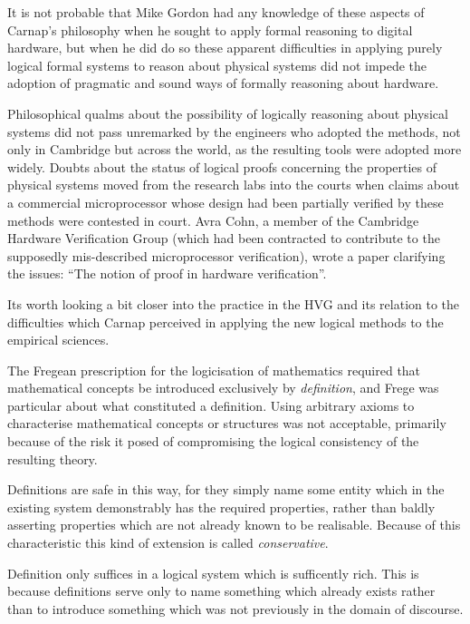 \documentclass[10pt,titlepage]{book}
\begin{document}
It is not probable that Mike Gordon had any knowledge of these aspects of Carnap's philosophy when he sought to apply formal reasoning to digital hardware, but when he did do so these apparent difficulties in applying purely logical formal systems to reason about physical systems did not impede the adoption of pragmatic and sound ways of formally reasoning about hardware.

Philosophical qualms about the possibility of logically reasoning about physical systems did not pass unremarked by the engineers who adopted the methods, not only in Cambridge but across the world, as the resulting tools were adopted more widely.
Doubts about the status of logical proofs concerning the properties of physical systems moved from the research labs into the courts when claims about a commercial microprocessor whose design had been partially verified by these methods were contested in court.
Avra Cohn, a member of the Cambridge Hardware Verification Group (which had been contracted to contribute to the supposedly mis-described microprocessor verification), wrote a paper clarifying the issues: ``The notion of proof in hardware verification''\cite{cohnPIHV}.

Its worth looking a bit closer into the practice in the HVG and its relation to the difficulties which Carnap perceived in applying the new logical methods to the empirical sciences.

The Fregean prescription for the logicisation of mathematics required that mathematical concepts be introduced exclusively by \emph{definition}, and Frege was particular about what constituted a definition.
Using arbitrary axioms to characterise mathematical concepts or structures was not acceptable, primarily because of the risk it posed of compromising the logical consistency of the resulting theory.

Definitions are safe in this way, for they simply name some entity which in the existing system demonstrably has the required properties, rather than baldly asserting properties which are not already known to be realisable.
Because of this characteristic this kind of extension is called \emph{conservative}.

Definition only suffices in a logical system which is sufficently rich.
This is because definitions serve only to name something which already exists rather than to introduce something which was not previously in the domain of discourse.
\end{document}
